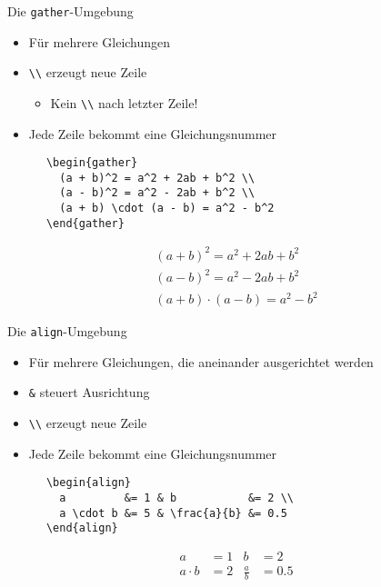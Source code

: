 \begin{frame}[fragile]{Die \texttt{gather}-Umgebung}
  \begin{itemize}
    \item Für mehrere Gleichungen
    \item \verb+\\+ erzeugt neue Zeile
      \begin{itemize}
        \item Kein \verb+\\+ nach letzter Zeile!
      \end{itemize}
    \item Jede Zeile bekommt eine Gleichungsnummer
  \end{itemize}
  \begin{CodeExample}{0.53}
    \begin{lstlisting}
      \begin{gather}
        (a + b)^2 = a^2 + 2ab + b^2 \\
        (a - b)^2 = a^2 - 2ab + b^2 \\
        (a + b) \cdot (a - b) = a^2 - b^2
      \end{gather}
    \end{lstlisting}
  \CodeResult
    \begin{gather}
      (a + b)^2 = a^2 + 2ab + b^2 \\
      (a - b)^2 = a^2 - 2ab + b^2 \\
      (a + b) \cdot (a - b) = a^2 - b^2
    \end{gather}
  \end{CodeExample}
\end{frame}

\begin{frame}[fragile]{Die \texttt{align}-Umgebung}
  \begin{itemize}
    \item Für mehrere Gleichungen, die aneinander ausgerichtet werden
    \item \texttt{\&} steuert Ausrichtung
    \item \verb+\\+ erzeugt neue Zeile
    \item Jede Zeile bekommt eine Gleichungsnummer
  \end{itemize}
  \begin{CodeExample}{0.65}
    \begin{lstlisting}
      \begin{align}
        a         &= 1 & b           &= 2 \\
        a \cdot b &= 5 & \frac{a}{b} &= 0.5
      \end{align}
    \end{lstlisting}
  \CodeResult
    \begin{align}
      a         &= 1 & b           &= 2 \\
      a \cdot b &= 2 & \frac{a}{b} &= 0.5
    \end{align}
  \end{CodeExample}
\end{frame}

